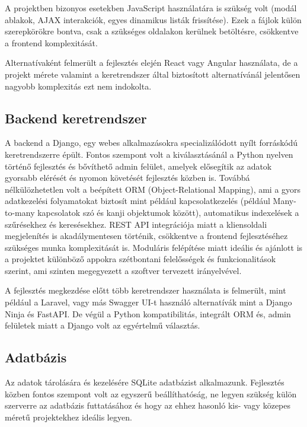 A projektben bizonyos esetekben JavaScript használatára is szükség volt (modál ablakok, AJAX interakciók, egyes dinamikus listák frissítése). Ezek a fájlok külön szerepkörökre bontva, csak a szükséges oldalakon kerülnek betöltésre, csökkentve a frontend komplexitását.

Alternatívaként felmerült a fejlesztés elején React vagy Angular használata, de a projekt mérete valamint a keretrendszer által biztosított alternatívánál jelentősen nagyobb komplexitás ezt nem indokolta.

\subsection{Backend keretrendszer}

A backend a Django, egy webes alkalmazásokra specializálódott nyílt forráskódú keretrendszerre épült. Fontos szempont volt a kiválasztásánál a Python nyelven történő fejlesztés és bővíthető admin felület, amelyek elősegítik az adatok gyorsabb elérését és nyomon követését fejlesztés közben is. Továbbá nélkülözhetetlen volt a beépített ORM (Object-Relational Mapping), ami a gyors adatkezelési folyamatokat biztosít mint például kapcsolatkezelés (például Many-to-many kapcsolatok szó és kanji objektumok között), automatikus indexelések a szűrésekhez és keresésekhez. REST API integrációja miatt a kliensoldali megjelenítés is akadálymentesen történik, csökkentve a frontend fejlesztéséhez szükséges munka komplexitását is. Moduláris felépítése miatt ideális és ajánlott is a projektet különböző appokra szétbontani felelősségek és funkcionalitások szerint, ami szinten megegyezett a szoftver tervezett irányelvével.

A fejlesztés megkezdése előtt több keretrendszer használata is felmerült, mint például a Laravel, vagy más Swagger UI-t használó alternatívák mint a Django Ninja és FastAPI. De végül a Python kompatibilitás, integrált ORM és, admin felületek miatt a Django volt az egyértelmű választás.

\subsection{Adatbázis}

Az adatok tárolására és kezelésére SQLite adatbázist alkalmazunk. Fejlesztés közben fontos szempont volt az egyszerű beállíthatóság, ne legyen szükség külön szerverre az adatbázis futtatásához és hogy az ehhez hasonló kis- vagy közepes méretű projektekhez ideális legyen.

